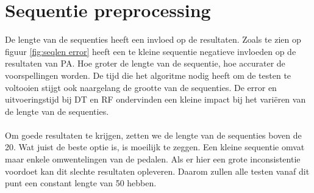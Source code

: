 \section{Sequentie preprocessing}
De lengte van de sequenties heeft een invloed op de resultaten. Zoals te zien op figuur \ref{fig:seqlen error} heeft een te kleine sequentie negatieve invloeden op de resultaten van PA. Hoe groter de lengte van de sequentie, hoe accurater de voorspellingen worden. De tijd die het algoritme nodig heeft om de testen te voltooien stijgt ook naargelang de grootte van de sequenties. De error en uitvoeringstijd bij DT en RF ondervinden een kleine impact bij het variëren van de lengte van de sequenties. 
\\\\
Om goede resultaten te krijgen, zetten we de lengte van de sequenties boven de 20. Wat juist de beste optie is, is moeilijk te zeggen. Een kleine sequentie omvat maar enkele omwentelingen van de pedalen. Als er hier een grote inconsistentie voordoet kan dit slechte resultaten opleveren. Daarom zullen alle testen vanaf dit punt een constant lengte van 50 hebben. 
